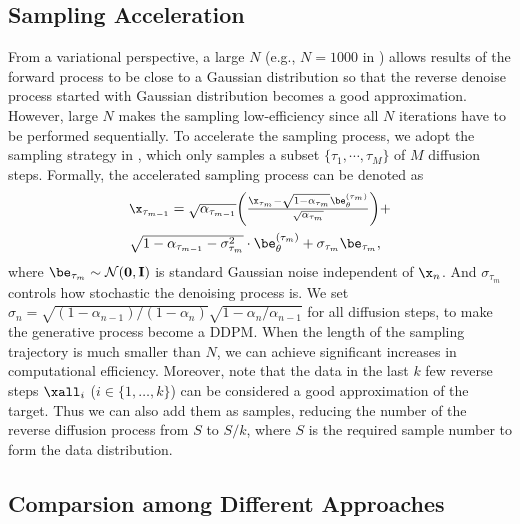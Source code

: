 {\subsection{Sampling Acceleration}
\par From a variational perspective, a large $N$ (e.g.,  $N=1000$ in \cite{ho2020denoising}) allows results of the forward process to be close to a Gaussian distribution so that the reverse denoise process started with Gaussian distribution becomes a good approximation. However, large $N$ makes the sampling low-efficiency since all $N$ iterations have to be performed sequentially. To accelerate the sampling process, we adopt the sampling strategy in \cite{song2020denoising}, which only samples a subset $\{\tau_1, \cdots, \tau_{M} \}$ of $M$ diffusion steps. Formally, the accelerated sampling process can be denoted as
\begin{equation}
\begin{array}{l}
    \small
     \x_{\tau_{m-1}}=\sqrt{\alpha_{\tau_{m-1}}} {\left(\frac{\x_{\tau_m}-\sqrt{1-\alpha_{\tau_m}} \be_\theta^{(\tau_m)}}{\sqrt{\alpha_{\tau_m}}}\right)}+ \vspace{5pt} \\ 
     {\sqrt{1-\alpha_{\tau_{m-1}}-\sigma_{\tau_m}^2} \cdot \be_\theta^{(\tau_m)}} + {\sigma_{\tau_m} \be_{\tau_m}}, 
\end{array}
\end{equation}
where $\be_{\tau_m} \sim \mathcal{N}(\mathbf{0}, \mathbf{I})$ is standard Gaussian noise independent of $\x_n$. And $\sigma_{\tau_m}$ controls how stochastic the denoising process is. We set $\sigma_n=\sqrt{\left(1-\alpha_{n-1}\right) /\left(1-\alpha_n\right)} \sqrt{1-\alpha_n / \alpha_{n-1}}$ for all diffusion steps, to make the generative process become a DDPM. When the length of the sampling trajectory is much smaller than $N$, we can achieve significant increases in computational efficiency. Moreover, note that the data in the last $k$ few reverse steps $\xall_{i}$ ($i \in \{1,\dots, k\}$) can be considered a good approximation of the target. Thus we can also add them as samples, reducing the number of the reverse diffusion process from $S$ to $S/k$, where $S$ is the required sample number to form the data distribution.

\subsection{Comparsion among Different Approaches}

}
